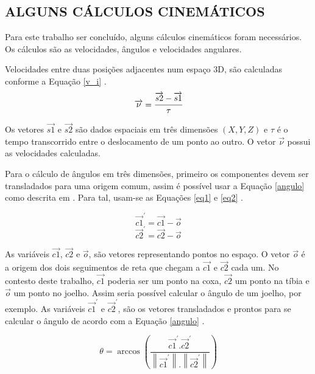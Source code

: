 \subsection{ALGUNS CÁLCULOS CINEMÁTICOS}
Para este trabalho ser concluído, alguns cálculos cinemáticos foram necessários. Os cálculos são  as velocidades, ângulos e velocidades angulares.

Velocidades entre duas posições adjacentes num espaço 3D, são calculadas conforme a Equação \ref{v_i} \cite{Poole2011}.
\begin{equation}
	\label{v_i}
	\overrightarrow{\nu} =  \cfrac{\overrightarrow{s2} - \overrightarrow{s1}}{\tau}
\end{equation}

Os vetores $\overrightarrow{s1}$ e $\overrightarrow{s2}$ são dados espaciais em três dimensões $(X, Y, Z)$ e $\tau$ é o tempo transcorrido entre o deslocamento de um ponto ao outro. O vetor $\overrightarrow{\nu}$ possui as velocidades calculadas.

Para o cálculo de ângulos em três dimensões, primeiro os componentes devem ser transladados para uma origem comum, assim é possível usar a 
Equação \ref{angulo} como descrita em . 
Para tal, usam-se as Equações \ref{eq1} e \ref{eq2} \cite{Poole2011}.

\begin{equation}
	\label{eq1}
	\overrightarrow{c1}^\prime =  \overrightarrow{c1} - \overrightarrow{o}
\end{equation}
\begin{equation}
	\label{eq2}
	\overrightarrow{c2}^\prime =  \overrightarrow{c2} - \overrightarrow{o}
\end{equation}

As variáveis $\overrightarrow{c1}$, $\overrightarrow{c2}$ e $\overrightarrow{o}$, são vetores representando pontos no espaço. 
O vetor $\overrightarrow{o}$ é a origem dos dois seguimentos de reta que chegam a $\overrightarrow{c1}$ e $\overrightarrow{c2}$ cada um. 
No contesto deste trabalho, $\overrightarrow{c1}$ poderia ser um ponto na coxa, $\overrightarrow{c2}$ um ponto na tíbia e $\overrightarrow{o}$ um ponto no joelho. 
Assim seria possível calcular o ângulo de um joelho, por exemplo. 
As variáveis $\overrightarrow{c1}^\prime$ e $\overrightarrow{c2}^\prime$, são os vetores transladados e prontos para se calcular o ângulo de acordo com a Equação \ref{angulo} \cite{Edwards2006}.

\begin{equation}
	\label{angulo}
	\theta = \arccos{(\frac{\overrightarrow{c1}^\prime.\overrightarrow{c2}^\prime} 
	{  \left \| \overrightarrow{c1}^\prime \right \|. \left \| \overrightarrow{c2}^\prime \right \|} )} 
\end{equation}

